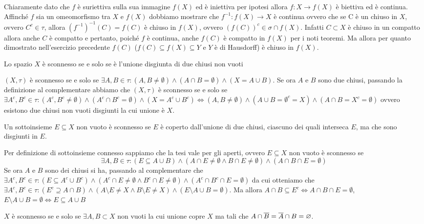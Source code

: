 \documentclass[a4paper]{article}\par \usepackage{style}\par
\begin{document}
\begin{es}
\end{es}\par Chiaramente dato che $ f $ è suriettiva sulla sua immagine $ f(X) $ ed è iniettiva per ipotesi allora $ f \colon X \to f(X) $ è biettiva ed è continua. Affinché $ f $ sia un omeomorfismo tra $ X $ e $ f(X) $ dobbiamo mostrare che $ f^{-1} \colon f(X) \to X  $ è continua ovvero che se C è un chiuso in $ X $, ovvero $ C^c \in \tau $, allora $ (f^{-1})^{-1}(C) = f(C) $ è chiuso in $ f(X) $, ovvero $ (f(C))^c \in \sigma \cap f(X) $. Infatti $ C \subset X $ è chiuso in un compatto allora anche $ C $ è compatto e pertanto, poiché $ f $ è continua,  anche $ f(C) $ è compatto in $ f(X) $ per i noti teoremi. Ma allora per quanto dimostrato nell'esercizio precedente $ f(C) $ ($ f(C) \subseteq f(X) \subseteq Y $ e $ Y $ è di Hausdorff) è chiuso in $ f(X) $.\par \begin{es}
  Lo spazio $ X $ è sconnesso se e solo se è l'unione disgiunta di due chiusi non vuoti
\end{es}\par $ (X, \tau) $ è sconnesso se e solo se $ \exists A, B \in \tau: (A, B \neq \emptyset) \wedge (A \cap B = \emptyset) \wedge (X = A \cup B) $. Se ora $ A $ e $ B $ sono due chiusi, passando la definizione al complementare abbiamo che $ (X, \tau) $ è sconnesso se e solo se $ \exists A^c, B^c \in \tau : (A^c, B^c \neq \emptyset) \wedge (A^c \cap B^c = \emptyset) \wedge (X = A^c \cup B^c) \iff (A, B \neq \emptyset) \wedge (A \cup B = \emptyset^c = X) \wedge (A \cap B = X^c = \emptyset) $ ovvero esistono due chiusi non vuoti disgiunti la cui unione è $ X $.\par \begin{es}
  Un sottoinsieme $ E \subseteq X $ non vuoto è sconnesso se $ E $ è coperto dall'unione di due chiusi, ciascuno dei quali interseca $ E $, ma che sono disgiunti in $ E $.
\end{es}\par Per definizione di sottoinsieme connesso sappiamo che la tesi vale per gli aperti, ovvero $ E \subseteq X $ non vuoto è sconnesso se \[\exists A, B \in \tau : (E \subseteq A \cup B) \wedge (A \cap E \neq \emptyset \wedge B \cap E \neq \emptyset) \wedge (A \cap B \cap E = \emptyset)\] Se ora $ A $ e $ B $ sono dei chiusi si ha, passando al complementare che $ \exists A^c, B^c \in \tau : (E \subseteq A^c \cup B^c) \wedge (A^c \cap E \neq \emptyset \wedge B^c \cap E \neq \emptyset) \wedge (A^c \cap B^c \cap E = \emptyset) $ da cui otteniamo che $ \exists A^c, B^c \in \tau : (E^c \supseteq A \cap B) \wedge (A \setminus E \neq X \wedge B \setminus E \neq X) \wedge (E \setminus A \cup B = \emptyset) $. Ma allora $ A \cap B \subseteq E^c \iff A \cap B \cap E = \emptyset $, $ E \setminus A \cup B = \emptyset \iff E \subseteq A \cup B $\par \begin{es}
  $ X $ è sconnesso se e solo se $ \exists A, B \subset X $ non vuoti la cui unione copre $ X $ ma tali che $ A \cap \overline{B} = \overline{A} \cap B = \varnothing $.
\end{es}\par 
\end{document}
